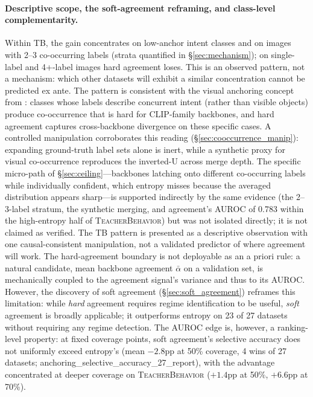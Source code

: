 \documentclass[a4paper,fleqn]{cas-sc}
\newcommand{\tb}{\textsc{TeacherBehavior}}
\begin{document}
\paragraph{Descriptive scope, the soft-agreement reframing, and class-level complementarity.}
\label{sec:no_diagnostic}
Within TB, the gain concentrates on low-anchor intent classes and on images with 2--3 co-occurring labels (strata quantified in \S\ref{sec:mechanism}); on single-label and 4+-label images hard agreement loses. This is an observed pattern, not a mechanism: which other datasets will exhibit a similar concentration cannot be predicted ex ante. The pattern is consistent with the visual anchoring concept from \citet{llm_annotation}: classes whose labels describe concurrent intent (rather than visible objects) produce co-occurrence that is hard for CLIP-family backbones, and hard agreement captures cross-backbone divergence on these specific cases. A controlled manipulation corroborates this reading (\S\ref{sec:cooccurrence_manip}): expanding ground-truth label sets alone is inert, while a synthetic proxy for visual co-occurrence reproduces the inverted-U across merge depth. The specific micro-path of \S\ref{sec:ceiling}---backbones latching onto different co-occurring labels while individually confident, which entropy misses because the averaged distribution appears sharp---is supported indirectly by the same evidence (the 2--3-label stratum, the synthetic merging, and agreement's AUROC of 0.783 within the high-entropy half of \tb) but was not isolated directly; it is not claimed as verified. The TB pattern is presented as a descriptive observation with one causal-consistent manipulation, not a validated predictor of where agreement will work.
The hard-agreement boundary is not deployable as an a priori rule: a natural candidate, mean backbone agreement $\bar{\alpha}$ on a validation set, is mechanically coupled to the agreement signal's variance and thus to its AUROC.
However, the discovery of soft agreement (\S\ref{sec:soft_agreement}) reframes this limitation: while \emph{hard} agreement requires regime identification to be useful, \emph{soft} agreement is broadly applicable; it outperforms entropy on 23 of 27 datasets without requiring any regime detection.
The AUROC edge is, however, a ranking-level property: at fixed coverage points, soft agreement's selective accuracy does not uniformly exceed entropy's (mean $-2.8$pp at 50\% coverage, 4 wins of 27 datasets; anchoring\_selective\_accuracy\_27\_report), with the advantage concentrated at deeper coverage on \tb{} ($+1.4$pp at 50\%, $+6.6$pp at 70\%).
\end{document}
